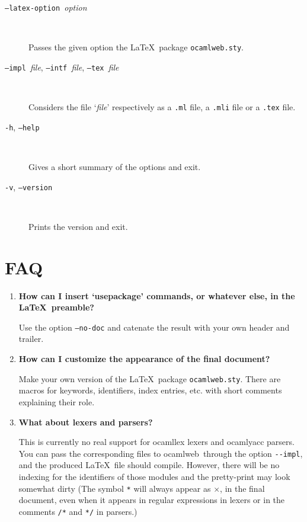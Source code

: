 \documentclass[12pt]{article}
\newcommand{\ocamlweb}{\textsf{ocamlweb}}
\begin{document}
\begin{description}
\item[\texttt{--latex-option }\textit{option}] ~\par

  Passes the given option the \LaTeX\ package \texttt{ocamlweb.sty}. 

\item[\texttt{--impl }\textit{file}, \texttt{--intf }\textit{file}, 
      \texttt{--tex }\textit{file}] ~\par

  Considers the file `\textit{file}' respectively as a \verb!.ml! file, a
  \verb!.mli! file or a \verb!.tex! file.

\item[\texttt{-h}, \texttt{--help}] ~\par

  Gives a short summary of the options and exit.

\item[\texttt{-v}, \texttt{--version}] ~\par

  Prints the version and exit.

\end{description}


\section{FAQ}

\begin{enumerate}
\item \textbf{How can I insert `usepackage' commands, or whatever else,
  in the \LaTeX\ preamble?} ~\par

  Use the option \texttt{--no-doc} and catenate the result with your
  own header and trailer.

\item \textbf{How can I customize the appearance of the final
    document?} ~\par 

  Make your own version of the \LaTeX\ package
  \texttt{ocamlweb.sty}. There are macros for keywords, identifiers,
  index entries, etc. with short comments explaining their role.

\item \textbf{What about lexers and parsers?} ~\par

  This is currently no real support for \textsf{ocamllex} lexers and
  \textsf{ocamlyacc} parsers. You can pass the corresponding files to
  \ocamlweb\ through the option \verb!--impl!, and the produced
  \LaTeX\ file should compile. However, there will be no indexing for
  the identifiers of those modules and the pretty-print may look
  somewhat dirty (The symbol \verb!*! will always appear as $\times$,
  in the final document, even when it appears in regular expressions
  in lexers or in the comments \verb!/*! and \verb!*/! in parsers.)


\end{enumerate}



\end{document}
